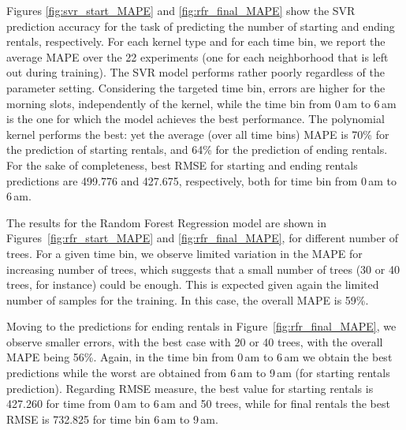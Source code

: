Figures \ref{fig:svr_start_MAPE} and \ref{fig:rfr_final_MAPE} show the SVR prediction accuracy for the task of predicting the number of starting and ending rentals, respectively. For each kernel type and for each time bin, we report the average MAPE over the 22 experiments (one for each neighborhood that is left out during training). The SVR model performs rather poorly regardless of the parameter setting. Considering the targeted time bin, errors are higher for the morning slots, independently of the kernel, while the time bin from 0\,am to 6\,am is the one for which the model achieves the best performance. The polynomial kernel performs the best: yet the average (over all time bins) MAPE is 70\% for the prediction of starting rentals, and 64\% for the prediction of ending rentals. For the sake of completeness, best RMSE for starting and ending rentals predictions are 499.776 and 427.675, respectively, both for time bin from 0\,am to 6\,am.


The results for the Random Forest Regression model are shown in Figures~\ref{fig:rfr_start_MAPE} and  \ref{fig:rfr_final_MAPE}, for different number of trees. For a given time bin, we observe limited variation in the MAPE for increasing number of trees, which suggests that a small number of trees (30 or 40 trees, for instance) could be enough. This is expected given again the limited number of samples for the training. In this case, the overall MAPE is 59\%.

Moving to the predictions for ending rentals in Figure~\ref{fig:rfr_final_MAPE}, we observe smaller errors, with the best case with 20 or 40 trees, with the overall MAPE being 56\%. Again, in the time bin from 0\,am to 6\,am we obtain the best predictions while the worst are obtained from 6\,am to 9\,am (for starting rentals prediction).  Regarding RMSE measure, the best value for starting rentals is 427.260 for time from 0\,am to 6\,am and 50 trees, while for final rentals the best RMSE is 732.825 for time bin 6\,am to 9\,am.

